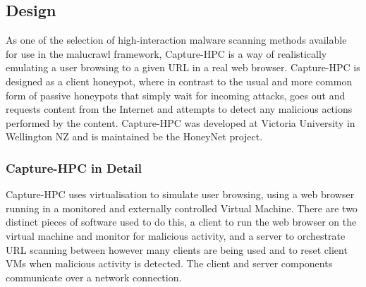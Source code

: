 \subsection{Design}

As one of the selection of high-interaction malware scanning
methods available for use in the malucrawl framework,
Capture-HPC\cite{capture-hpc} is a way of
realistically emulating a user browsing to a given URL in a real web browser.
Capture-HPC is designed as a client honeypot, where in contrast to the usual and
more common form of passive honeypots that simply wait for incoming attacks,
goes out and requests content from the Internet and attempts to detect any
malicious actions performed by the content. Capture-HPC was developed at Victoria
University in Wellington NZ and is maintained be the HoneyNet project\cite{honeynet}.

\subsubsection{Capture-HPC in Detail}

Capture-HPC uses virtualisation to simulate user browsing, using a web browser
running in a monitored and externally controlled Virtual Machine. There are two
distinct pieces of software used to do this, a client to run the web browser on
the virtual machine and monitor for malicious activity, and a server to
orchestrate URL scanning between however many clients are being used and to
reset client VMs when malicious activity is detected. The client and server
components communicate over a network connection.
